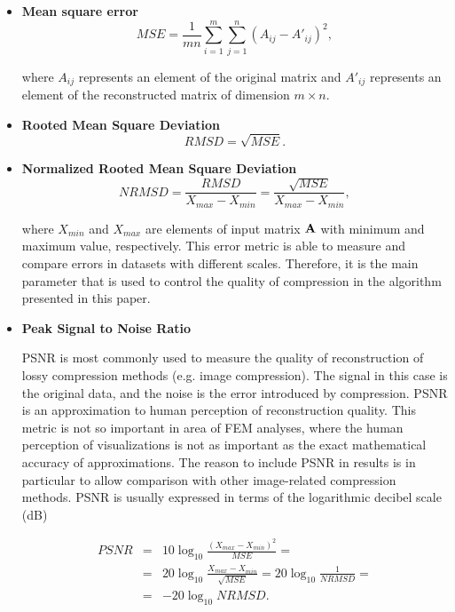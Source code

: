 \begin{itemize}
\item \textbf{Mean square error}
\begin{equation}
MSE=\frac{1}{m n} \sum_{i=1}^{m} \sum_{j=1}^{n} (A_{ij} - A'_{ij})^{2},
\label{eq:mse-def}
\end{equation}

\noindent
where $A_{ij}$ represents an element of the original matrix and $A'_{ij}$ represents an element of the
reconstructed matrix of dimension $m \times n$.

\item \textbf{Rooted Mean Square Deviation}
\begin{equation}
RMSD=\sqrt{MSE}.
\label{eq:rmsd-def}
\end{equation}

\item \textbf{Normalized Rooted Mean Square Deviation}
\begin{equation}
NRMSD=\frac{RMSD}{X_{max}-X_{min}}=\frac{\sqrt{MSE}}{X_{max}-X_{min}},
\label{eq:nrmsd-def}
\end{equation}

\noindent
where $X_{min}$ and $X_{max}$ are elements of input matrix $\mathbf{A}$ with minimum and maximum value, respectively. This error metric is able to measure and compare errors in datasets with different scales. Therefore, it is the main parameter that is used to control the quality of compression in the algorithm presented in this paper.

\item \textbf{Peak Signal to Noise Ratio}

PSNR is most commonly used to measure the quality of reconstruction of lossy compression methods (e.g. image compression). The signal in this case is the original data, and the noise is the error introduced by compression. PSNR is an approximation to human perception of reconstruction quality. This metric is not so important in area of FEM analyses, where the human perception of visualizations is not as important as the exact mathematical accuracy of approximations. The reason to include PSNR in results is in particular to allow comparison with other image-related compression methods. PSNR is usually expressed in terms of the logarithmic decibel scale (dB)

\begin{eqnarray}
PSNR &=& 10\log_{10}\frac{(X_{max}-X_{min})^{2}}{MSE} =
\\
&=& 20\log_{10}\frac{X_{max}-X_{min}}{\sqrt{MSE}}=20\log_{10}\frac{1}{NRMSD} = \nonumber
\\
&=& -20\log_{10}NRMSD. \nonumber
\label{eq:psnr-def}
\end{eqnarray}

\end{itemize}


